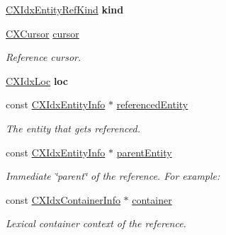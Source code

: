 \begin{DoxyCompactItemize}
\item 
\mbox{\label{structCXIdxEntityRefInfo_a2fe39009e3bf47bcc95ecaa638b88705}} 
\mbox{\hyperlink{group__CINDEX__HIGH_ga4158d96205b540d3ef4992cf6689c2aa}{C\+X\+Idx\+Entity\+Ref\+Kind}} {\bfseries kind}
\item 
\mbox{\label{structCXIdxEntityRefInfo_a4ab3eace1d62834dab9eb8dc2be61677}} 
\mbox{\hyperlink{structCXCursor}{C\+X\+Cursor}} \mbox{\hyperlink{structCXIdxEntityRefInfo_a4ab3eace1d62834dab9eb8dc2be61677}{cursor}}
\begin{DoxyCompactList}\small\item\em Reference cursor. \end{DoxyCompactList}\item 
\mbox{\label{structCXIdxEntityRefInfo_a7d94b4e276b5834756bedfd3918a1b03}} 
\mbox{\hyperlink{structCXIdxLoc}{C\+X\+Idx\+Loc}} {\bfseries loc}
\item 
\mbox{\label{structCXIdxEntityRefInfo_a5ce7e39d0504c0ee598cc7e0fc28f00d}} 
const \mbox{\hyperlink{structCXIdxEntityInfo}{C\+X\+Idx\+Entity\+Info}} $\ast$ \mbox{\hyperlink{structCXIdxEntityRefInfo_a5ce7e39d0504c0ee598cc7e0fc28f00d}{referenced\+Entity}}
\begin{DoxyCompactList}\small\item\em The entity that gets referenced. \end{DoxyCompactList}\item 
const \mbox{\hyperlink{structCXIdxEntityInfo}{C\+X\+Idx\+Entity\+Info}} $\ast$ \mbox{\hyperlink{structCXIdxEntityRefInfo_aa01a3ce2b823d13984eed3ab0676a3b7}{parent\+Entity}}
\begin{DoxyCompactList}\small\item\em Immediate \char`\"{}parent\char`\"{} of the reference. For example\+: \end{DoxyCompactList}\item 
\mbox{\label{structCXIdxEntityRefInfo_a52b5199fb32f1cf2bac41e2b40f9cc32}} 
const \mbox{\hyperlink{structCXIdxContainerInfo}{C\+X\+Idx\+Container\+Info}} $\ast$ \mbox{\hyperlink{structCXIdxEntityRefInfo_a52b5199fb32f1cf2bac41e2b40f9cc32}{container}}
\begin{DoxyCompactList}\small\item\em Lexical container context of the reference. \end{DoxyCompactList}\end{DoxyCompactItemize}


